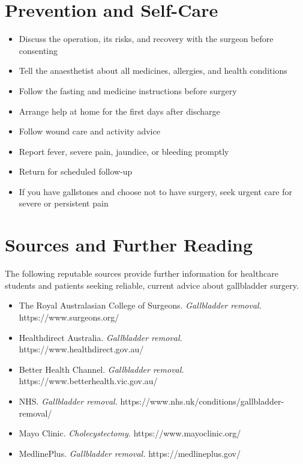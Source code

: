 \section*{Prevention and Self-Care}
\begin{itemize}
    \item Discuss the operation, its risks, and recovery with the surgeon before consenting
    \item Tell the anaesthetist about all medicines, allergies, and health conditions
    \item Follow the fasting and medicine instructions before surgery
    \item Arrange help at home for the first days after discharge
    \item Follow wound care and activity advice
    \item Report fever, severe pain, jaundice, or bleeding promptly
    \item Return for scheduled follow-up
    \item If you have gallstones and choose not to have surgery, seek urgent care for severe or persistent pain
\end{itemize}

\section*{Sources and Further Reading}
The following reputable sources provide further information for healthcare students and patients seeking reliable, current advice about gallbladder surgery.
\begin{itemize}
    \item The Royal Australasian College of Surgeons. \textit{Gallbladder removal.} https://www.surgeons.org/
    \item Healthdirect Australia. \textit{Gallbladder removal.} https://www.healthdirect.gov.au/
    \item Better Health Channel. \textit{Gallbladder removal.} https://www.betterhealth.vic.gov.au/
    \item NHS. \textit{Gallbladder removal.} https://www.nhs.uk/conditions/gallbladder-removal/
    \item Mayo Clinic. \textit{Cholecystectomy.} https://www.mayoclinic.org/
    \item MedlinePlus. \textit{Gallbladder removal.} https://medlineplus.gov/
\end{itemize}
